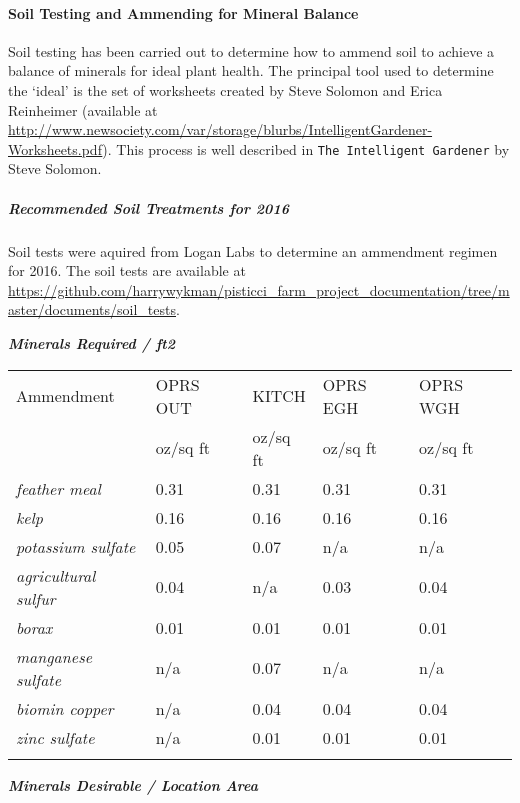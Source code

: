 \paragraph{Soil Testing and Ammending for Mineral
Balance}\label{soil-testing-and-ammending-for-mineral-balance}

Soil testing has been carried out to determine how to ammend soil to
achieve a balance of minerals for ideal plant health. The principal tool
used to determine the `ideal' is the set of worksheets created by Steve
Solomon and Erica Reinheimer (available at
\url{http://www.newsociety.com/var/storage/blurbs/IntelligentGardener-Worksheets.pdf}).
This process is well described in \texttt{The Intelligent Gardener} by
Steve Solomon.

\subparagraph{Recommended Soil Treatments for
2016}\label{recommended-soil-treatments-for-2016}

Soil tests were aquired from Logan Labs to determine an ammendment
regimen for 2016. The soil tests are available at
\url{https://github.com/harrywykman/pisticci_farm_project_documentation/tree/master/documents/soil_tests}.

\textbf{\emph{Minerals Required / ft2}}

\begin{longtable}[c]{@{}lllll@{}}
\toprule\addlinespace
Ammendment & OPRS OUT & KITCH & OPRS EGH & OPRS WGH
\\\addlinespace
\midrule\endhead
& oz/sq ft & oz/sq ft & oz/sq ft & oz/sq ft
\\\addlinespace
\emph{feather meal} & 0.31 & 0.31 & 0.31 & 0.31
\\\addlinespace
\emph{kelp} & 0.16 & 0.16 & 0.16 & 0.16
\\\addlinespace
\emph{potassium sulfate} & 0.05 & 0.07 & n/a & n/a
\\\addlinespace
\emph{agricultural sulfur} & 0.04 & n/a & 0.03 & 0.04
\\\addlinespace
\emph{borax} & 0.01 & 0.01 & 0.01 & 0.01
\\\addlinespace
\emph{manganese sulfate} & n/a & 0.07 & n/a & n/a
\\\addlinespace
\emph{biomin copper} & n/a & 0.04 & 0.04 & 0.04
\\\addlinespace
\emph{zinc sulfate} & n/a & 0.01 & 0.01 & 0.01
\\\addlinespace
\bottomrule
\end{longtable}

\textbf{\emph{Minerals Desirable / Location Area}}

